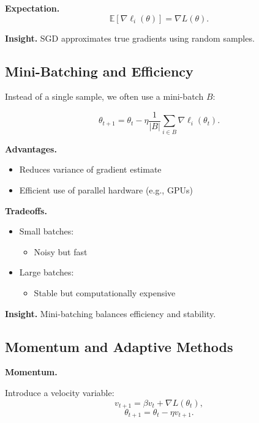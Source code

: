 \medskip

\noindent
\textbf{Expectation.}
\[
\mathbb{E}[\nabla \ell_i(\theta)] = \nabla L(\theta).
\]

\medskip

\noindent
\textbf{Insight.}  
SGD approximates true gradients using random samples.

\subsection{Mini-Batching and Efficiency}

Instead of a single sample, we often use a mini-batch $B$:

\[
\theta_{t+1} = \theta_t - \eta \frac{1}{|B|} \sum_{i \in B} \nabla \ell_i(\theta_t).
\]

\medskip

\noindent
\textbf{Advantages.}
\begin{itemize}
    \item Reduces variance of gradient estimate
    \item Efficient use of parallel hardware (e.g., GPUs)
\end{itemize}

\medskip

\noindent
\textbf{Tradeoffs.}
\begin{itemize}
    \item Small batches:
    \begin{itemize}
        \item Noisy but fast
    \end{itemize}
    \item Large batches:
    \begin{itemize}
        \item Stable but computationally expensive
    \end{itemize}
\end{itemize}

\medskip

\noindent
\textbf{Insight.}  
Mini-batching balances efficiency and stability.

\subsection{Momentum and Adaptive Methods}

\textbf{Momentum.}

Introduce a velocity variable:
\[
v_{t+1} = \beta v_t + \nabla L(\theta_t),
\]
\[
\theta_{t+1} = \theta_t - \eta v_{t+1}.
\]

